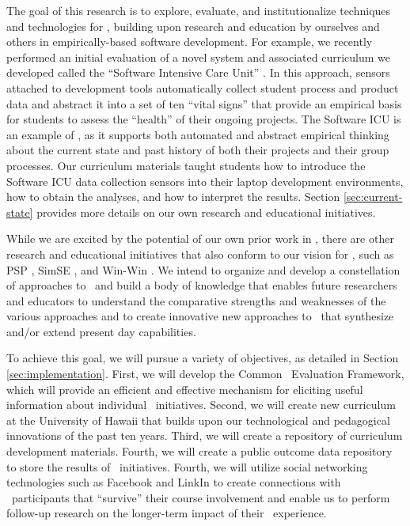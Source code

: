 The goal of this research is to explore, evaluate, and institutionalize
techniques and technologies for \eCT, building upon research and education
by ourselves and others in empirically-based software development.  For
example, we recently performed an initial evaluation of a novel system and
associated curriculum we developed called the ``Software Intensive Care
Unit'' \citep{csdl2-09-02}.  In this approach, sensors attached to
development tools automatically collect student process and product data
and abstract it into a set of ten ``vital signs'' that provide an empirical
basis for students to assess the ``health'' of their ongoing projects.  The
Software ICU is an example of \eCT, as it supports both automated and
abstract empirical thinking about the current state and past history of
both their projects and their group processes.  Our curriculum materials
taught students how to introduce the Software ICU data collection sensors
into their laptop development environments, how to obtain the analyses, and
how to interpret the results. Section \ref{sec:current-state} provides more
details on our own research and educational initiatives.

While we are excited by the potential of our own prior work in \eCT, there
are other research and educational initiatives that also conform to our
vision for \eCT, such as PSP \citep{Humphrey95}, SimSE \citep{Navarro07}, and 
Win-Win \citep{Valerdi07}.  We intend to organize and develop a constellation of
approaches to \eCT\ and build a body of knowledge that enables future
researchers and educators to understand the comparative strengths and
weaknesses of the various approaches and to create innovative new
approaches to \eCT\ that synthesize and/or extend present day capabilities.

To achieve this goal, we will pursue a variety of objectives, as detailed in 
Section \ref{sec:implementation}.  First, we will develop the Common \eCT\
Evaluation Framework, which will provide an efficient and effective mechanism
for eliciting useful information about individual \eCT\ initiatives.  
Second, we will create new curriculum at the University of Hawaii that builds
upon our technological and pedagogical innovations of the past ten years.  
Third, we will create a repository of curriculum development materials. Fourth,
we will create a public outcome data repository to store the results of \eCT\
initiatives. Fourth, we will utilize social networking technologies such as
Facebook and LinkIn to create connections with \eCT\ participants that 
``survive'' their course involvement and enable us to perform follow-up research
on the longer-term impact of their \eCT\ experience. 

